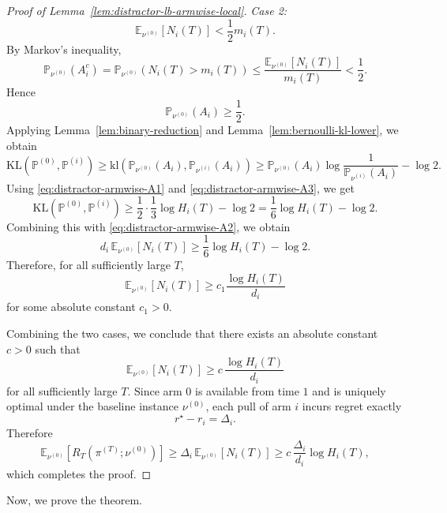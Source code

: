\documentclass[11pt]{article}
\begin{document}
\begin{proof}[Proof of Lemma~\ref{lem:distractor-lb-armwise-local}]
\medskip
\noindent
\textit{Case 2:}
\[
\mathbb E_{\nu^{(0)}}[N_i(T)]< \frac12 m_i(T).
\]
By Markov's inequality,
\[
\mathbb P_{\nu^{(0)}}(A_i^c)
=
\mathbb P_{\nu^{(0)}}(N_i(T)>m_i(T))
\le
\frac{\mathbb E_{\nu^{(0)}}[N_i(T)]}{m_i(T)}
<
\frac12.
\]
Hence
\begin{equation}
\mathbb P_{\nu^{(0)}}(A_i)\ge \frac12.
\label{eq:distractor-armwise-A3}
\end{equation}
Applying Lemma~\ref{lem:binary-reduction} and
Lemma~\ref{lem:bernoulli-kl-lower}, we obtain
\[
\mathrm{KL}(\mathbb P^{(0)},\mathbb P^{(i)})
\ge
\mathrm{kl}\left(\mathbb P_{\nu^{(0)}}(A_i),\mathbb P_{\nu^{(i)}}(A_i)\right)
\ge
\mathbb P_{\nu^{(0)}}(A_i)\log\frac{1}{\mathbb P_{\nu^{(i)}}(A_i)}-\log 2.
\]
Using \eqref{eq:distractor-armwise-A1} and \eqref{eq:distractor-armwise-A3}, we
get
\[
\mathrm{KL}(\mathbb P^{(0)},\mathbb P^{(i)})
\ge
\frac12\cdot \frac13\log H_i(T)-\log 2
=
\frac16\log H_i(T)-\log 2.
\]
Combining this with \eqref{eq:distractor-armwise-A2}, we obtain
\[
d_i\,\mathbb E_{\nu^{(0)}}[N_i(T)]
\ge
\frac16\log H_i(T)-\log 2.
\]
Therefore, for all sufficiently large $T$,
\[
\mathbb E_{\nu^{(0)}}[N_i(T)]
\ge
c_1\frac{\log H_i(T)}{d_i}
\]
for some absolute constant $c_1>0$.

\medskip

Combining the two cases, we conclude that there exists an absolute constant
$c>0$ such that
\[
\mathbb E_{\nu^{(0)}}[N_i(T)]
\ge
c\,\frac{\log H_i(T)}{d_i}
\]
for all sufficiently large $T$. Since arm $0$ is available from time $1$ and is uniquely optimal under the
baseline instance $\nu^{(0)}$, each pull of arm $i$ incurs regret exactly
\[
r^\star-r_i=\Delta_i.
\]
Therefore
\[
\mathbb E_{\nu^{(0)}}[R_T(\pi^{(T)};\nu^{(0)})]
\ge
\Delta_i\,\mathbb E_{\nu^{(0)}}[N_i(T)]
\ge
c\,\frac{\Delta_i}{d_i}\log H_i(T),
\]
which completes the proof.
\end{proof}

Now, we prove the theorem.
\end{document}
